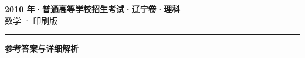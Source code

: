 \documentclass[zihao=5, a4paper]{ctexart}
\begin{document}
\begin{center}
  {\Large\bfseries 2010 年·普通高等学校招生考试·辽宁卷·理科}\\[4pt]
  {\large 数学 · 印刷版}
\end{center}
\medskip
{}

\par\bigskip\hrule\bigskip
{}
\begin{center}{\large\bfseries 参考答案与详细解析}\end{center}
\smallskip

\end{document}
